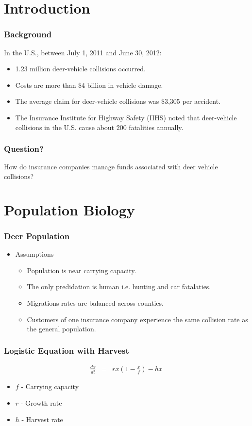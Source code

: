 
\section{Introduction}

\begin{frame}
    \frametitle{Background}
In the U.S., between July 1, 2011 and June 30, 2012:
    \begin{itemize}
    	\item 1.23 million deer-vehicle collisions occurred.
    	\item Costs are more than \$4 billion in vehicle damage.
    	\item The average claim for deer-vehicle collisions was \$3,305 per accident.
    	\item The Insurance Institute for Highway Safety (IIHS) noted that deer-vehicle collisions in the U.S. cause about 200 fatalities annually.
    \end{itemize}
\end{frame}


\begin{frame}
    \frametitle{Question?}
How do insurance companies manage funds associated with deer vehicle collisions?
\end{frame}


\section{Population Biology}

\begin{frame}
    \frametitle{Deer Population}
    \begin{itemize}
    	\item Assumptions
		\begin{itemize}
    		\item Population is near carrying capacity.
    		\item The only predidation is human i.e. hunting and car fatalaties.
    		\item Migrations rates are balanced across counties.
		\item Customers of one insurance company experience the same collision rate as the general population.
    		\end{itemize}
    \end{itemize}
\end{frame}

\begin{frame}
    \frametitle{Logistic Equation with Harvest}
	\vspace{-1cm}
	\begin{eqnarray*}
		\frac{dx}{dt} &=& rx \left( 1-\frac{x}{f} \right) -hx
	\end{eqnarray*}
	\begin{itemize}
		\item $f$ - Carrying capacity
		\item $r$ - Growth rate
		\item $h$ - Harvest rate
	\end{itemize}
\end{frame}

